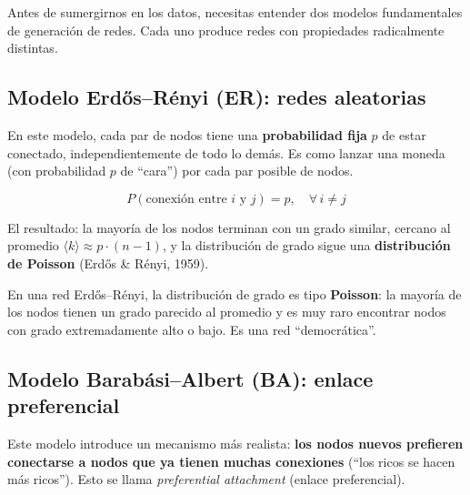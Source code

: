 \documentclass[
  letterpaper,
  DIV=11,
  numbers=noendperiod]{scrreprt}
\begin{document}
Antes de sumergirnos en los datos, necesitas entender dos modelos
fundamentales de generación de redes. Cada uno produce redes con
propiedades radicalmente distintas.

\subsection{Modelo Erdős--Rényi (ER): redes
aleatorias}\label{modelo-erdux151sruxe9nyi-er-redes-aleatorias}

En este modelo, cada par de nodos tiene una \textbf{probabilidad fija}
\(p\) de estar conectado, independientemente de todo lo demás. Es como
lanzar una moneda (con probabilidad \(p\) de ``cara'') por cada par
posible de nodos.

\[
P(\text{conexión entre } i \text{ y } j) = p, \quad \forall \, i \neq j
\]

El resultado: la mayoría de los nodos terminan con un grado similar,
cercano al promedio \(\langle k \rangle \approx p \cdot (n-1)\), y la
distribución de grado sigue una \textbf{distribución de Poisson} (Erdős
\& Rényi, 1959).

\begin{tcolorbox}[enhanced jigsaw, toprule=.15mm, colframe=quarto-callout-tip-color-frame, coltitle=black, titlerule=0mm, colback=white, breakable, leftrule=.75mm, arc=.35mm, bottomtitle=1mm, toptitle=1mm, rightrule=.15mm, bottomrule=.15mm, left=2mm, title=\textcolor{quarto-callout-tip-color}{\faLightbulb}\hspace{0.5em}{💡 Concepto clave}, colbacktitle=quarto-callout-tip-color!10!white, opacityback=0, opacitybacktitle=0.6]

En una red Erdős--Rényi, la distribución de grado es tipo
\textbf{Poisson}: la mayoría de los nodos tienen un grado parecido al
promedio y es muy raro encontrar nodos con grado extremadamente alto o
bajo. Es una red ``democrática''.

\end{tcolorbox}

\subsection{Modelo Barabási--Albert (BA): enlace
preferencial}\label{modelo-barabuxe1sialbert-ba-enlace-preferencial}

Este modelo introduce un mecanismo más realista: \textbf{los nodos
nuevos prefieren conectarse a nodos que ya tienen muchas conexiones}
(``los ricos se hacen más ricos''). Esto se llama \emph{preferential
attachment} (enlace preferencial).
\end{document}
